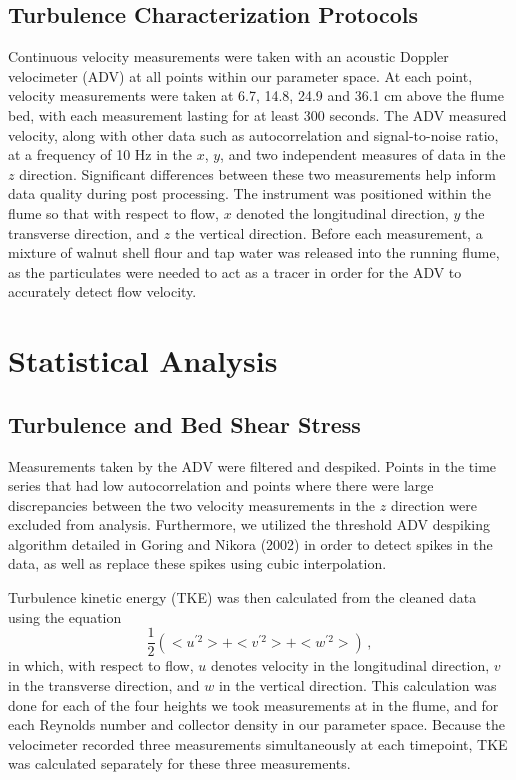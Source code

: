 \documentclass{scrreprt}
\begin{document}
\subsection{Turbulence Characterization Protocols}
Continuous velocity measurements were taken with an acoustic Doppler velocimeter (ADV) at all points within our parameter space. At each point, velocity measurements were taken at 6.7, 14.8, 24.9 and 36.1 cm above the flume bed, with each measurement lasting for at least 300 seconds. The ADV measured velocity, along with other data such as autocorrelation and signal-to-noise ratio, at a frequency of 10 Hz in the $x$, $y$, and two independent measures of data in the $z$ direction. Significant differences between these two measurements help inform data quality during post processing. The instrument was positioned within the flume so that with respect to flow, $x$ denoted the longitudinal direction, $y$ the transverse direction, and $z$ the vertical direction. Before each measurement, a mixture of walnut shell flour and tap water was released into the running flume, as the particulates were needed to act as a tracer in order for the ADV to accurately detect flow velocity.

\section{Statistical Analysis}

\subsection{Turbulence and Bed Shear Stress}
Measurements taken by the ADV were filtered and despiked. Points in the time series that had low autocorrelation and points where there were large discrepancies between the two velocity measurements in the $z$ direction were excluded from analysis. Furthermore, we utilized the threshold ADV despiking algorithm detailed in Goring and Nikora (2002) in order to detect spikes in the data, as well as replace these spikes using cubic interpolation.

Turbulence kinetic energy (TKE) was then calculated from the cleaned data using the equation 
\[\frac{1}{2}(<u^{'2}> + <v^{'2}> + <w^{'2}>)\,,\]
in which, with respect to flow, $u$ denotes velocity in the longitudinal direction, $v$ in the transverse direction, and $w$ in the vertical direction. This calculation was done for each of the four heights we took measurements at in the flume, and for each Reynolds number and collector density in our parameter space. Because the velocimeter recorded three measurements simultaneously at each timepoint, TKE was calculated separately for these three measurements. 
\end{document}
